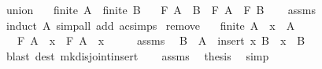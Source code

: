 \begin{isabellebody}
\isamarkupfalse%
%
\endisatagproof
{\isafoldproof}%
%
\isadelimproof
\isanewline
%
\endisadelimproof
\isanewline
{}\isamarkupfalse%
\ union{\isacharcolon}{\kern0pt}\isanewline
\ \ \ {\isachardoublequoteopen}finite\ A{\isachardoublequoteclose}\ \ {\isachardoublequoteopen}finite\ B{\isachardoublequoteclose}\isanewline
\ \ \ {\isachardoublequoteopen}F\ {\isacharparenleft}{\kern0pt}A\ {\isasymunion}\ B{\isacharparenright}{\kern0pt}\ {\isacharequal}{\kern0pt}\ F\ A\ \isactrlbold {\isacharasterisk}{\kern0pt}\ F\ B{\isachardoublequoteclose}\isanewline
%
\isadelimproof
\ \ %
\endisadelimproof
%
\isatagproof
{}\isamarkupfalse%
\ assms\ \isamarkupfalse%
\ {\isacharparenleft}{\kern0pt}induct\ A{\isacharparenright}{\kern0pt}\ {\isacharparenleft}{\kern0pt}simp{\isacharunderscore}{\kern0pt}all\ add{\isacharcolon}{\kern0pt}\ ac{\isacharunderscore}{\kern0pt}simps{\isacharparenright}{\kern0pt}%
\endisatagproof
{\isafoldproof}%
%
\isadelimproof
\isanewline
%
\endisadelimproof
\isanewline
{}\isamarkupfalse%
\ remove{\isacharcolon}{\kern0pt}\isanewline
\ \ \ {\isachardoublequoteopen}finite\ A{\isachardoublequoteclose}\ \ {\isachardoublequoteopen}x\ {\isasymin}\ A{\isachardoublequoteclose}\isanewline
\ \ \ {\isachardoublequoteopen}F\ A\ {\isacharequal}{\kern0pt}\ x\ \isactrlbold {\isacharasterisk}{\kern0pt}\ F\ {\isacharparenleft}{\kern0pt}A\ {\isacharminus}{\kern0pt}\ {\isacharbraceleft}{\kern0pt}x{\isacharbraceright}{\kern0pt}{\isacharparenright}{\kern0pt}{\isachardoublequoteclose}\isanewline
%
\isadelimproof
%
\endisadelimproof
%
\isatagproof
{}\isamarkupfalse%
\ {\isacharminus}{\kern0pt}\isanewline
\ \ \isamarkupfalse%
\ assms\ \isamarkupfalse%
\ B\ \ {\isachardoublequoteopen}A\ {\isacharequal}{\kern0pt}\ insert\ x\ B{\isachardoublequoteclose}\ \ {\isachardoublequoteopen}x\ {\isasymnotin}\ B{\isachardoublequoteclose}\ \isamarkupfalse%
\ {\isacharparenleft}{\kern0pt}blast\ dest{\isacharcolon}{\kern0pt}\ mk{\isacharunderscore}{\kern0pt}disjoint{\isacharunderscore}{\kern0pt}insert{\isacharparenright}{\kern0pt}\isanewline
\ \ \isamarkupfalse%
\ assms\ \isamarkupfalse%
\ {\isacharquery}{\kern0pt}thesis\ \isamarkupfalse%
\ simp\isanewline
{}\isamarkupfalse%
%
\endisatagproof
{\isafoldproof}%
%
\isadelimproof
\isanewline
%
\endisadelimproof

\end{isabellebody}
